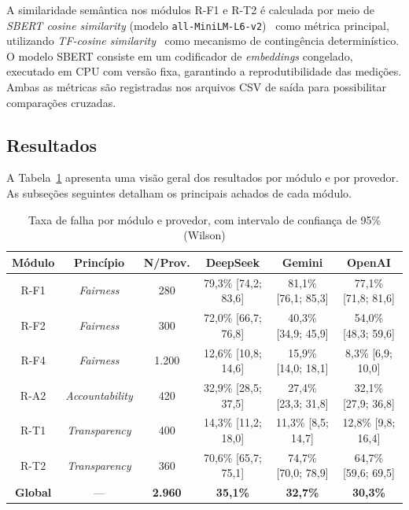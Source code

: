 A similaridade semântica nos módulos R-F1 e R-T2 é calculada por meio de \textit{SBERT cosine similarity} (modelo \texttt{all-MiniLM-L6-v2})~\cite{Reimers2019} como métrica principal, utilizando \textit{TF-cosine similarity}~\cite{Salton1988} como mecanismo de contingência determinístico. O modelo SBERT consiste em um codificador de \textit{embeddings} congelado, executado em CPU com versão fixa, garantindo a reprodutibilidade das medições. Ambas as métricas são registradas nos arquivos CSV de saída para possibilitar comparações cruzadas.

\subsection{Resultados}

A Tabela~\ref{tab:resultados_gerais} apresenta uma visão geral dos resultados por módulo e por provedor. As subseções seguintes detalham os principais achados de cada módulo.

\begin{table}[htbp]
\centering
\caption{Taxa de falha por módulo e provedor, com intervalo de confiança de 95\% (Wilson)}
\label{tab:resultados_gerais}
\scriptsize
\begin{tabular}{|c|c|c|c|c|c|}
\hline
\textbf{Módulo} & \textbf{Princípio} & \textbf{N/Prov.} & \textbf{DeepSeek} & \textbf{Gemini} & \textbf{OpenAI} \\ \hline
R-F1 & \textit{Fairness} & 280 & 79,3\% [74,2; 83,6] & 81,1\% [76,1; 85,3] & 77,1\% [71,8; 81,6] \\ \hline
R-F2 & \textit{Fairness} & 300 & 72,0\% [66,7; 76,8] & 40,3\% [34,9; 45,9] & 54,0\% [48,3; 59,6] \\ \hline
R-F4 & \textit{Fairness} & 1.200 & 12,6\% [10,8; 14,6] & 15,9\% [14,0; 18,1] & 8,3\% [6,9; 10,0] \\ \hline
R-A2 & \textit{Accountability} & 420 & 32,9\% [28,5; 37,5] & 27,4\% [23,3; 31,8] & 32,1\% [27,9; 36,8] \\ \hline
R-T1 & \textit{Transparency} & 400 & 14,3\% [11,2; 18,0] & 11,3\% [8,5; 14,7] & 12,8\% [9,8; 16,4] \\ \hline
R-T2 & \textit{Transparency} & 360 & 70,6\% [65,7; 75,1] & 74,7\% [70,0; 78,9] & 64,7\% [59,6; 69,5] \\ \hline
\hline
\textbf{Global} & --- & \textbf{2.960} & \textbf{35,1\%} & \textbf{32,7\%} & \textbf{30,3\%} \\ \hline
\end{tabular}
\end{table}

